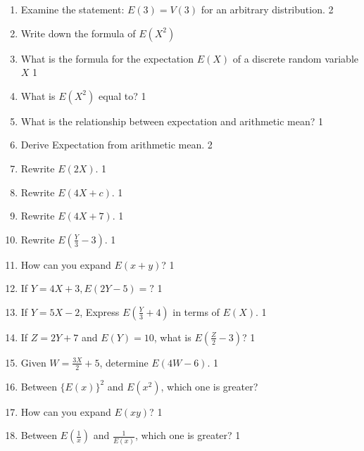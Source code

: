 \documentclass[a4paper,oneside]{book}
\begin{document}
\begin{enumerate}

  \item Examine the statement: $E(3) = V(3)$ for an arbitrary distribution. \hfill 2

  \item Write down the formula of $E(X^2)$

\item What is the formula for the expectation \( E(X) \) of a discrete random variable \( X \) \hfill 1

\item What is $E(X^2)$ equal to? \hfill 1

\item What is the relationship between expectation and arithmetic mean?  \hfill 1

\item Derive Expectation from arithmetic mean.  \hfill 2

\item Rewrite $E(2X)$.  \hfill 1

\item Rewrite $E(4X + c)$.  \hfill 1

\item Rewrite $E(4X + 7)$.  \hfill 1

\item Rewrite $E(\frac Y3 - 3)$.  \hfill 1

\item How can you expand $E(x+y)$? \hfill 1

\item If $Y = 4X + 3, E(2Y-5)=?$ \hfill 1

\item If $Y = 5X - 2$, Express $E\left(\frac{Y}{3} + 4\right)$ in terms of $E(X)$. \hfill 1

\item If $Z = 2Y + 7$ and $E(Y) = 10$, what is $E\left(\frac{Z}{2} - 3\right)$? \hfill 1

\item Given $W = \frac{3X}{2} + 5$, determine $E(4W - 6)$. \hfill 1

\item Between $\{E(x)\}^2$ and $E(x^2)$, which one is greater?

\item How can you expand $E(xy)$? \hfill 1

\item Between $\displaystyle E\left(\frac{1}{x}\right)$ and $\displaystyle \frac 1{E(x)}$, which one is greater? \hfill 1


\end{enumerate}
\end{document}
